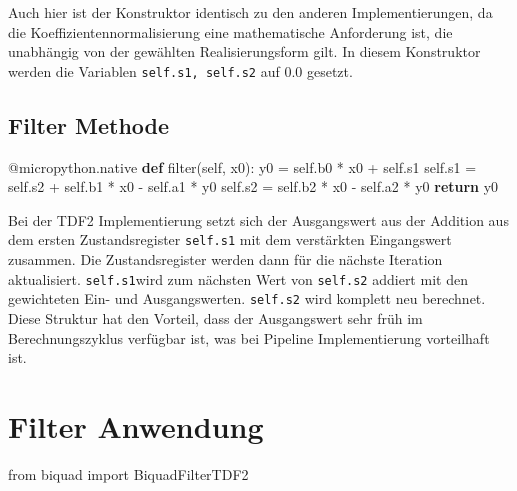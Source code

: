 \documentclass[
  ngerman,
  letterpaper,
  DIV=11]{scrreprt}
\newenvironment{Shaded}{\begin{snugshade}}{\end{snugshade}}
\newcommand{\AttributeTok}[1]{\textcolor[rgb]{0.40,0.45,0.13}{#1}}
\newcommand{\BuiltInTok}[1]{\textcolor[rgb]{0.00,0.23,0.31}{#1}}
\newcommand{\ControlFlowTok}[1]{\textcolor[rgb]{0.00,0.23,0.31}{\textbf{#1}}}
\newcommand{\ImportTok}[1]{\textcolor[rgb]{0.00,0.46,0.62}{#1}}
\newcommand{\KeywordTok}[1]{\textcolor[rgb]{0.00,0.23,0.31}{\textbf{#1}}}
\newcommand{\NormalTok}[1]{\textcolor[rgb]{0.00,0.23,0.31}{#1}}
\newcommand{\OperatorTok}[1]{\textcolor[rgb]{0.37,0.37,0.37}{#1}}
\newcommand{\VariableTok}[1]{\textcolor[rgb]{0.07,0.07,0.07}{#1}}
\begin{document}
Auch hier ist der Konstruktor identisch zu den anderen
Implementierungen, da die Koeffizientennormalisierung eine mathematische
Anforderung ist, die unabhängig von der gewählten Realisierungsform
gilt. In diesem Konstruktor werden die Variablen
\texttt{self.s1,\ self.s2} auf 0.0 gesetzt.

\subsection{Filter Methode}\label{filter-methode-5}

\begin{Shaded}
\begin{Highlighting}[]
    \AttributeTok{@micropython.native}
    \KeywordTok{def} \BuiltInTok{filter}\NormalTok{(}\VariableTok{self}\NormalTok{, x0):}
\NormalTok{        y0 }\OperatorTok{=} \VariableTok{self}\NormalTok{.b0 }\OperatorTok{*}\NormalTok{ x0 }\OperatorTok{+} \VariableTok{self}\NormalTok{.s1}
        \VariableTok{self}\NormalTok{.s1 }\OperatorTok{=} \VariableTok{self}\NormalTok{.s2 }\OperatorTok{+} \VariableTok{self}\NormalTok{.b1 }\OperatorTok{*}\NormalTok{ x0 }\OperatorTok{{-}} \VariableTok{self}\NormalTok{.a1 }\OperatorTok{*}\NormalTok{ y0}
        \VariableTok{self}\NormalTok{.s2 }\OperatorTok{=} \VariableTok{self}\NormalTok{.b2 }\OperatorTok{*}\NormalTok{ x0 }\OperatorTok{{-}} \VariableTok{self}\NormalTok{.a2 }\OperatorTok{*}\NormalTok{ y0}
        \ControlFlowTok{return}\NormalTok{ y0}
\end{Highlighting}
\end{Shaded}

Bei der TDF2 Implementierung setzt sich der Ausgangswert aus der
Addition aus dem ersten Zustandsregister \texttt{self.s1} mit dem
verstärkten Eingangswert zusammen. Die Zustandsregister werden dann für
die nächste Iteration aktualisiert. \texttt{self.s1}wird zum nächsten
Wert von \texttt{self.s2} addiert mit den gewichteten Ein- und
Ausgangswerten. \texttt{self.s2} wird komplett neu berechnet. Diese
Struktur hat den Vorteil, dass der Ausgangswert sehr früh im
Berechnungszyklus verfügbar ist, was bei Pipeline Implementierung
vorteilhaft ist.

\section{Filter Anwendung}\label{filter-anwendung-1}

\begin{Shaded}
\begin{Highlighting}[]
\ImportTok{from}\NormalTok{ biquad }\ImportTok{import}\NormalTok{ BiquadFilterTDF2}
\end{Highlighting}
\end{Shaded}
\end{document}
